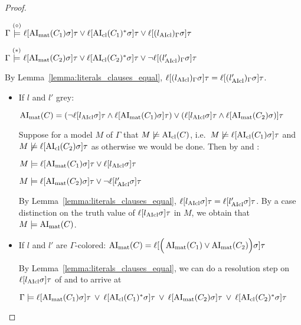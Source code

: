 \documentclass[,%
	paper=a4,%
	DIV12, %
	twoside=false,%
	liststotoc,
	bibtotoc,
	draft=false,%
	numbers=noendperiod
]{scrartcl}
\begin{document}
\begin{proof}
\begin{description}
			$\Gamma \stackrel{(\circ)}{\models} \ell[\operatorname{AI}_\mathrm{mat}(C_1)\sigma]\tau \lor \ell[\operatorname{AI}_\mathrm{cl}(C_1)^*\sigma]\tau \lor \ell[(l{_{\operatorname{AIcl}}})_\Gamma\sigma]\tau$

			$\Gamma \stackrel{(*)}{\models} \ell[\operatorname{AI}_\mathrm{mat}(C_2)\sigma]\tau \lor \ell[\operatorname{AI}_\mathrm{cl}(C_2)^*\sigma]\tau \lor \lnot \ell[(l{_{\operatorname{AIcl}}'})_\Gamma\sigma]\tau$



			By Lemma~\ref{lemma:literals_clauses_equal}, $\ell[(l_{\operatorname{AIcl}})_\Gamma\sigma]\tau = \ell[(l{_{\operatorname{AIcl}}'})_\Gamma\sigma] \tau$.

			\begin{itemize}
				\item If $l$ and $l'$ grey:

					$\operatorname{AI}_\mathrm{mat}(C) =
					(\lnot {\ell[l\ensuremath{_{\operatorname{AIcl}}}\sigma]\tau} \land \ell[\operatorname{AI}_\mathrm{mat}(C_1)\sigma]\tau) \lor
					(\ell[l_{\operatorname{AIcl}}\sigma]\tau \land \ell[\operatorname{AI}_\mathrm{mat}(C_2)\sigma) ]\tau
					$

					Suppose for a model $M$ of $\Gamma$ that $M \not\models \operatorname{AI}_\mathrm{cl}(C)$,
					i.e.~$M \not\models \ell[\operatorname{AI}_\mathrm{cl}(C_1)\sigma]\tau$ and $M \notentails\nolinebreak \lifboth{\AIclause(C_2)\sigma}\tau$ as otherwise we would be done.
					Then by \markA{} and \markB:

					$M \models \ell[\operatorname{AI}_\mathrm{mat}(C_1)\sigma]\tau \lor \ell[l{_{\operatorname{AIcl}}}\sigma]\tau$

					$M \models \ell[\operatorname{AI}_\mathrm{mat}(C_2)\sigma]\tau \lor \lnot \ell[l{_{\operatorname{AIcl}}'}\sigma]\tau$

					By Lemma~\ref{lemma:literals_clauses_equal}, $\ell[l_{\operatorname{AIcl}}\sigma]\tau = \ell[l{_{\operatorname{AIcl}}'}\sigma] \tau$.
					By a case distinction on the truth value of $\ell[l_{\operatorname{AIcl}}\sigma]\tau$ in $M$, we obtain that $M \models \operatorname{AI}_\mathrm{mat}(C)$.


				\item If $l$ and $l'$ are $\Gamma$-colored:
					$\operatorname{AI}_\mathrm{mat}(C) = \ell[\Big(\operatorname{AI}_\mathrm{mat}(C_1) \lor \operatorname{AI}_\mathrm{mat}(C_2)\Big)\sigma] \tau$

					By Lemma~\ref{lemma:literals_clauses_equal}, we can do a resolution step on $\ell[l_{\operatorname{AIcl}}\sigma]\tau$ of \markA{} and \markB{} to arrive at 

					$\Gamma \models \ell[\operatorname{AI}_\mathrm{mat}(C_1)\sigma]\tau \;\,{\lor}\;\, \ell[\operatorname{AI}_\mathrm{cl}(C_1)^*\sigma]\tau\;\,{\lor}\;\, 
					\ell[\operatorname{AI}_\mathrm{mat}(C_2)\sigma]\tau\;\,{\lor}\;\, \ell[\operatorname{AI}_\mathrm{cl}(C_2)^*\sigma]\tau $


\end{itemize}
\end{description}
\end{proof}
\end{document}
